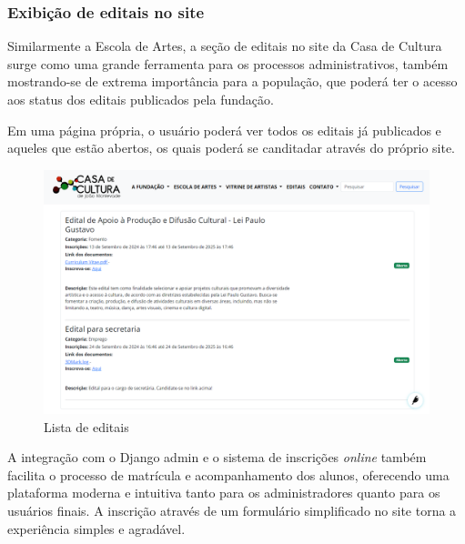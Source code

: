 \subsubsection{Exibição de editais no site}

Similarmente a Escola de Artes, a seção de editais no site da Casa de Cultura surge como uma grande ferramenta para os processos administrativos, também mostrando-se de extrema importância para a população, que poderá ter o acesso aos status dos editais publicados pela fundação.

Em uma página própria, o usuário poderá ver todos os editais já publicados e aqueles que estão abertos, os quais poderá se canditadar através do próprio site.

\begin{figure}[htb]
	\caption{\label{fig_grafico}Lista de editais}
	\begin{center}
	    \includegraphics[scale=0.25]{./img/lista_editais.png}
	\end{center}
\end{figure}

A integração com o Django admin e o sistema de inscrições \textit{online} também facilita o processo de matrícula e acompanhamento dos alunos, oferecendo uma plataforma moderna e intuitiva tanto para os administradores quanto para os usuários finais. A inscrição através de um formulário simplificado no site torna a experiência simples e agradável.

